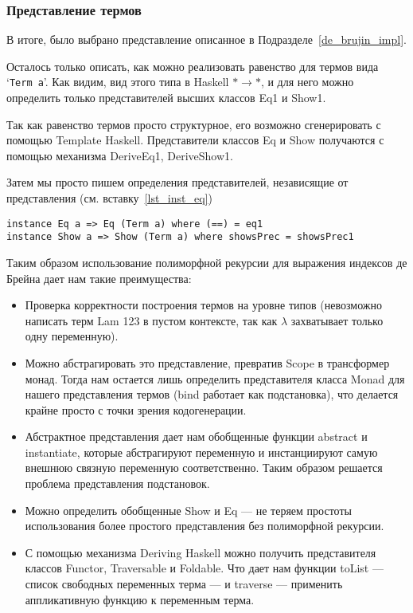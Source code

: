 \subsubsection{Представление термов}\label{final_repr}

В итоге, было выбрано представление описанное в Подразделе~\ref{de_brujin_impl}.

Осталось только описать, как можно реализовать равенство для термов вида `\lstinline{Term a}'. Как видим, вид этого типа в Haskell $* \rightarrow *$, и для него можно определить только представителей высших классов\cite{prel_extras} Eq1 и Show1.

Так как равенство термов просто структурное, его возможно сгенерировать с помощью Template Haskell\cite{TH}. Представители классов Eq и Show получаются с помощью механизма DeriveEq1, DeriveShow1\cite{deriveCompat}.

Затем мы просто пишем определения представителей, независящие от представления (см. вставку~\ref{lst_inst_eq})

\begin{lstlisting}[caption={Определение представителей классов Eq и Show для представления АСД}, captionpos=b, frame=single, float,floatplacement=H, label = {lst_inst_eq}]
instance Eq a => Eq (Term a) where (==) = eq1
instance Show a => Show (Term a) where showsPrec = showsPrec1
\end{lstlisting}

Таким образом использование полиморфной рекурсии для выражения индексов де Брейна дает нам такие преимущества:
\begin{itemize}
  \item Проверка корректности построения термов на уровне типов (невозможно написать терм Lam 123 в пустом контексте, так как $\lambda$ захватывает только одну переменную).
  \item Можно абстрагировать это представление, превратив Scope в трансформер монад. Тогда нам остается лишь определить представителя класса Monad для нашего представления термов (bind работает как подстановка), что делается крайне просто с точки зрения кодогенерации.
  \item Абстрактное представления дает нам обобщенные функции abstract и instantiate, которые абстрагируют переменную и инстанциируют самую внешнюю связную переменную соответственно. Таким образом решается проблема представления подстановок.
  \item Можно определить обобщенные Show и Eq --- не теряем простоты использования более простого представления без полиморфной рекурсии.
  \item С помощью механизма Deriving Haskell можно получить представителя классов Functor, Traversable и Foldable. Что дает нам функции toList --- список свободных переменных терма --- и traverse --- применить аппликативную функцию к переменным терма.

\end{itemize}
